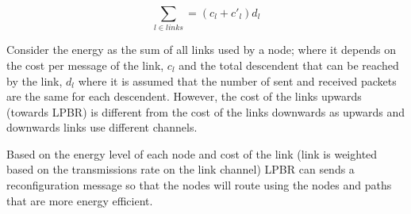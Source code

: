\begin{equation}
\sum_{l \in links} = (c_{l} + c'_{l})d_{l}
\end{equation}

Consider the energy as the sum of all links used by a node; where it depends on the cost per message of the link, $c_{l}$  and the total descendent that can be reached by the link, $d_{l}$ where it is assumed that the number of sent and received packets are the same for each descendent. However, the cost of the links upwards (towards LPBR) is different from the cost of the links downwards as upwards and downwards links use different channels. 

Based on the energy level of each node and cost of the link (link is weighted based on the transmissions rate on the link channel) LPBR can sends a reconfiguration message so that the nodes will route using the nodes and paths that are more energy efficient.







